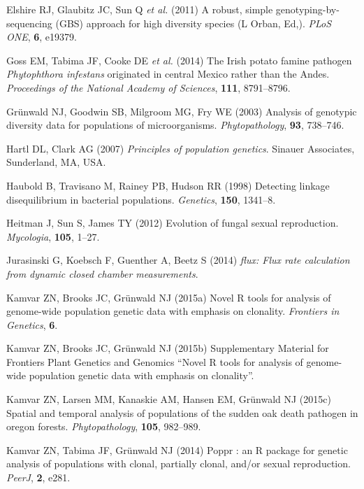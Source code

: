 \documentclass[]{article}
\theoremstyle{definition}
\theoremstyle{definition}
\theoremstyle{definition}
\theoremstyle{remark}
\begin{document}
\hypertarget{ref-elshire2011robust}{}
Elshire RJ, Glaubitz JC, Sun Q \emph{et al.} (2011) A robust, simple
genotyping-by-sequencing (GBS) approach for high diversity species (L
Orban, Ed,). \emph{PLoS ONE}, \textbf{6}, e19379.

\hypertarget{ref-goss2014irish}{}
Goss EM, Tabima JF, Cooke DE \emph{et al.} (2014) The Irish potato
famine pathogen \emph{Phytophthora infestans} originated in central
Mexico rather than the Andes. \emph{Proceedings of the National Academy
of Sciences}, \textbf{111}, 8791--8796.

\hypertarget{ref-grunwald2003analysis}{}
Grünwald NJ, Goodwin SB, Milgroom MG, Fry WE (2003) Analysis of
genotypic diversity data for populations of microorganisms.
\emph{Phytopathology}, \textbf{93}, 738--746.

\hypertarget{ref-hartl1997principles}{}
Hartl DL, Clark AG (2007) \emph{Principles of population genetics}.
Sinauer Associates, Sunderland, MA, USA.

\hypertarget{ref-haubold1998detecting}{}
Haubold B, Travisano M, Rainey PB, Hudson RR (1998) Detecting linkage
disequilibrium in bacterial populations. \emph{Genetics}, \textbf{150},
1341--8.

\hypertarget{ref-heitman2012evolution}{}
Heitman J, Sun S, James TY (2012) Evolution of fungal sexual
reproduction. \emph{Mycologia}, \textbf{105}, 1--27.

\hypertarget{ref-jurasinski2014flux}{}
Jurasinski G, Koebsch F, Guenther A, Beetz S (2014) \emph{flux: Flux
rate calculation from dynamic closed chamber measurements}.

\hypertarget{ref-kamvar2015novel}{}
Kamvar ZN, Brooks JC, Grünwald NJ (2015a) Novel R tools for analysis of
genome-wide population genetic data with emphasis on clonality.
\emph{Frontiers in Genetics}, \textbf{6}.

\hypertarget{ref-kamvar2015poppr2supp}{}
Kamvar ZN, Brooks JC, Grünwald NJ (2015b) Supplementary Material for
Frontiers Plant Genetics and Genomics ``Novel R tools for analysis of
genome-wide population genetic data with emphasis on clonality''.

\hypertarget{ref-kamvar2015spatial}{}
Kamvar ZN, Larsen MM, Kanaskie AM, Hansen EM, Grünwald NJ (2015c)
Spatial and temporal analysis of populations of the sudden oak death
pathogen in oregon forests. \emph{Phytopathology}, \textbf{105},
982--989.

\hypertarget{ref-kamvar2014poppr}{}
Kamvar ZN, Tabima JF, Grünwald NJ (2014) Poppr : an R package for
genetic analysis of populations with clonal, partially clonal, and/or
sexual reproduction. \emph{PeerJ}, \textbf{2}, e281.
\end{document}
